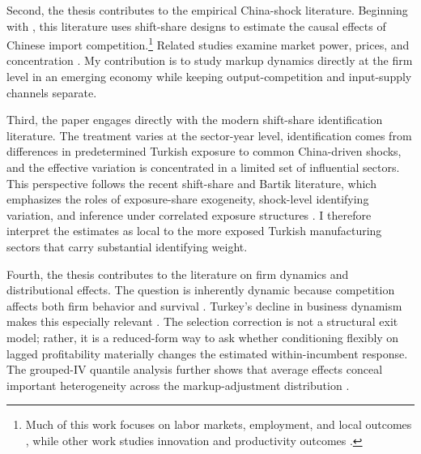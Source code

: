 \documentclass[12pt]{article}
\begin{document}
Second, the thesis contributes to the empirical China-shock literature. Beginning with \autocite{autorChinaSyndromeLocal2013}, this literature uses shift-share designs to estimate the causal effects of Chinese import competition.\footnote{Much of this work focuses on labor markets, employment, and local outcomes \parencite{autorTradeAdjustmentWorkerLevel2014, acemogluImportCompetitionGreat2016,pierceSurprisinglySwiftDecline2016}, while other work studies innovation and productivity outcomes \parencite{aghionOpposingFirmLevelResponses2024, bloomTradeInducedTechnical2016}.} Related studies examine market power, prices, and concentration \parencite{deloeckerPricesMarkupsTrade2016,impullittiGlobalizationMarketPower2023,jaravelWhatArePrice,amitiUSMarketConcentration2025}. My contribution is to study markup dynamics directly at the firm level in an emerging economy while keeping output-competition and input-supply channels separate.

Third, the paper engages directly with the modern shift-share identification literature. The treatment varies at the sector-year level, identification comes from differences in predetermined Turkish exposure to common China-driven shocks, and the effective variation is concentrated in a limited set of influential sectors. This perspective follows the recent shift-share and Bartik literature, which emphasizes the roles of exposure-share exogeneity, shock-level identifying variation, and inference under correlated exposure structures \parencite{adaoShiftShareDesignsTheory2019,borusyakQuasiExperimentalShiftShareResearch2022,goldsmith-pinkhamBartikInstrumentsWhat2020}. I therefore interpret the estimates as local to the more exposed Turkish manufacturing sectors that carry substantial identifying weight.

Fourth, the thesis contributes to the literature on firm dynamics and distributional effects. The question is inherently dynamic because competition affects both firm behavior and survival \parencite{melitzImpactTradeIntraIndustry2003,ericsonMarkovPerfectIndustryDynamics1995,hopenhaynEntryExitFirm1992}. Turkey's decline in business dynamism makes this especially relevant \parencite{akcigitFactsBusinessDynamism2020}. The selection correction is not a structural exit model; rather, it is a reduced-form way to ask whether conditioning flexibly on lagged profitability materially changes the estimated within-incumbent response. The grouped-IV quantile analysis further shows that average effects conceal important heterogeneity across the markup-adjustment distribution \parencite{chetverikovIVQuantileRegression2016,galleSlicingPieQuantifying2023,bursteinBottomUpMarkupFluctuations2025,baqaeeProductivityMisallocationGeneral2020}.
\end{document}

